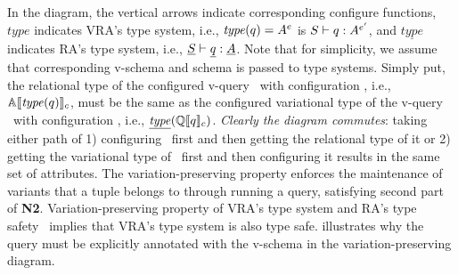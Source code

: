 %
\begin{wrapfigure}{r}{0.12\textwidth}
\begin{center}
\end{center}
\end{wrapfigure}
%
In the diagram, 
the vertical arrows indicate corresponding configure functions,
\ensuremath{\mathit{type}} indicates VRA's type system, 
i.e., \ensuremath{\mathit{type}(\vQ) = \annot \vAttList} is 
\ensuremath{\envWithoutVctx \vQ {\envInContext [\VVal \vctx] \vType}},
and
\ensuremath{\underline{\mathit{type}}} indicates RA's type system,
i.e., \ensuremath{\pEnv {\pQ} {\pAttList}}.
Note that for simplicity, we assume that corresponding v-schema and schema is
passed to type systems.
Simply put, 
the relational type of the configured v-query \vQ\ with configuration \config, 
i.e., \ensuremath{\olSem {\mathit{type} (q)}},
must be the same as the configured variational type 
of the v-query \vQ\ with configuration \config, 
i.e., \ensuremath{\underline {\mathit{type}} (\eeSem {\vQ})}.
\emph{Clearly the diagram commutes}: taking either path of 1) configuring \vQ\ first and 
then getting the relational type of it or 
2) getting the variational type of \vQ\ first and then configuring it results
in the same set of attributes. 
The variation-preserving property enforces the maintenance of variants that a tuple
belongs to through running a query, satisfying second part of \textbf{N2}.
%
Variation-preserving property of VRA's type system and RA's type safety~\cite{RAtypeSys} 
implies that VRA's type system is also type safe.
 illustrates why the query must be explicitly annotated with the v-schema
in the variation-preserving diagram.

